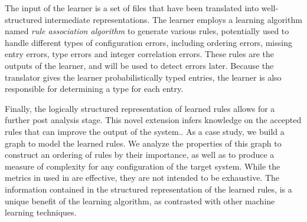 The input of the learner is a set of files that have been translated
into well-structured intermediate representations. 
The learner employs a learning algorithm named {\em rule association 
algorithm} to generate various rules,
potentially used to handle different types of configuration errors,
including ordering errors, missing entry errors,
type errors and integer correlation errors.
These rules are the outputs of the learner, 
and will be used to detect errors later.
Because the translator gives the learner probabilistically typed entries,
the learner is also responsible for determining a type for each entry.

Finally, the logically structured representation of learned rules allows for a further post analysis stage.
This novel extension infers knowledge on the accepted rules that can improve the output of the system..
As a case study, we build a graph to model the learned rules.
We analyze the properties of this graph to construct an ordering of rules by their importance, 
  as well as to produce a measure of complexity for any configuration of the target system.
While the metrics in used in \app are effective, they are not intended to be exhaustive.
The information contained in the structured representation of the learned rules, 
  is a unique benefit of the learning algorithm, as contrasted with other machine learning techniques.

